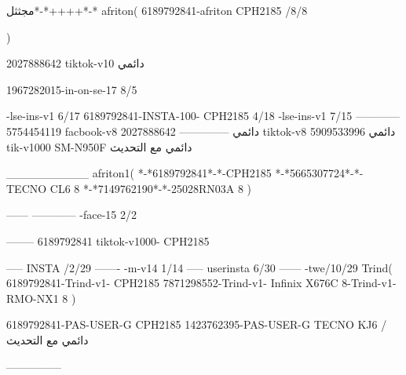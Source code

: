 مجثثل*-*++++*-*
afriton(
6189792841-afriton CPH2185  /8/8

)

2027888642 tiktok-v10
دائمي

1967282015-in-on-se-17 8/5

-lse-ins-v1 6/17
6189792841-INSTA-100- CPH2185 4/18
-lse-ins-v1 7/15
------------
5754454119 facbook-v8
دائمي
--------------
2027888642 tiktok-v8
دائمي
5909533996 tik-v1000  SM-N950F
دائمي مع التحديث

__________
afriton1(
*-*6189792841*-*-CPH2185
*-*5665307724*-*-TECNO CL6  8\1
*-*7149762190*-*-25028RN03A  8
)


------
------------
-face-15 2/2

--------
6189792841 tiktok-v1000- CPH2185 


-----
 INSTA /2/29
-------
-m-v14 1/14
-----
userinsta 6/30
------
-twe/10/29
Trind(
6189792841-Trind-v1- CPH2185 
7871298552-Trind-v1-  Infinix X676C  8-Trind-v1-  RMO-NX1  8\5
)


6189792841-PAS-USER-G CPH2185 
1423762395-PAS-USER-G TECNO KJ6  /دائمي مع التحديث

    ---------------
